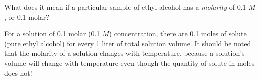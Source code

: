 

What does it mean if a particular sample of ethyl alcohol has a {\it molarity} of 0.1 $M$, or 0.1 molar?







For a solution of 0.1 molar (0.1 $M$) concentration, there are 0.1 moles of solute (pure ethyl alcohol) for every 1 liter of total solution volume.  It should be noted that the molarity of a solution changes with temperature, because a solution's volume will change with temperature even though the quantity of solute in moles does not!











